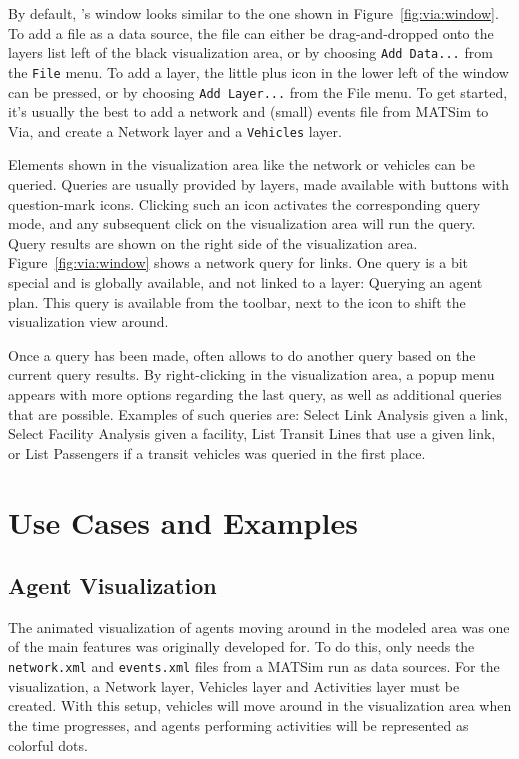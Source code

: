 By default, \Via{}'s window looks similar to the one shown in Figure~\ref{fig:via:window}.
To add a file as a data source, the file can either be drag-and-dropped onto the layers
list left of the black visualization area, or by choosing \lstinline|Add Data...|
from the \lstinline|File| menu. To add a layer, the little plus icon in the lower left of
the window can be pressed, or by choosing \lstinline|Add Layer...| from the File
menu. To get started, it's usually the best to add a network and (small) events
file from MATSim to Via, and create a Network layer and a \lstinline|Vehicles| layer.

Elements shown in the visualization area like the network or vehicles can
be queried. Queries are usually provided by layers, made available with buttons
with question-mark icons. Clicking such an icon activates the corresponding
query mode, and any subsequent click on the visualization area will run the
query.
Query results are shown on the right side of the visualization area.
Figure~\ref{fig:via:window} shows a network query for links.
One query is a bit special and is globally available, and not linked to a
layer: Querying an agent plan. This query is available from the toolbar, next to
the icon to shift the visualization view around.

Once a query has been made, \Via{} often allows to do another query based on the
current query results. By right-clicking in the visualization area, a popup menu
appears with more options regarding the last query, as well as additional
queries that are possible. Examples of such queries are: Select Link Analysis
given a link, Select Facility Analysis given a facility, List Transit Lines that
use a given link, or List Passengers if a transit vehicles was queried in the
first place.

\section{Use Cases and Examples}
\subsection{Agent Visualization}
The animated visualization of agents moving around in the modeled area was one
of the main features \Via{} was originally developed for. To do this, \Via{}
only needs the \lstinline|network.xml| and \lstinline|events.xml| files from a MATSim run
as data sources. For the visualization, a Network layer, Vehicles layer and
Activities layer must be created. With this setup, vehicles will move around in
the visualization area when the time progresses, and agents performing
activities will be represented as colorful dots.

